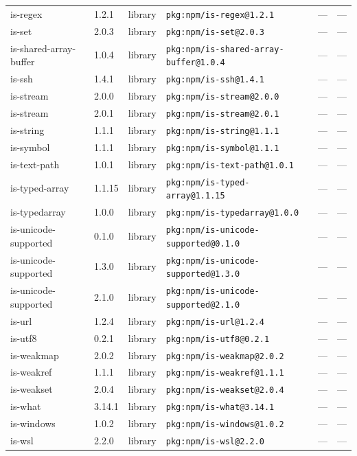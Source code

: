 \documentclass[11pt]{article}
\begin{document}
\begin{longtable}{|l|l|l|p{2.2cm}|l|p{4cm}|}
is-regex & 1.2.1 & library & \texttt{pkg:npm/is-regex@1.2.1} & — & — \\
is-set & 2.0.3 & library & \texttt{pkg:npm/is-set@2.0.3} & — & — \\
is-shared-array-buffer & 1.0.4 & library & \texttt{pkg:npm/is-shared-array-buffer@1.0.4} & — & — \\
is-ssh & 1.4.1 & library & \texttt{pkg:npm/is-ssh@1.4.1} & — & — \\
is-stream & 2.0.0 & library & \texttt{pkg:npm/is-stream@2.0.0} & — & — \\
is-stream & 2.0.1 & library & \texttt{pkg:npm/is-stream@2.0.1} & — & — \\
is-string & 1.1.1 & library & \texttt{pkg:npm/is-string@1.1.1} & — & — \\
is-symbol & 1.1.1 & library & \texttt{pkg:npm/is-symbol@1.1.1} & — & — \\
is-text-path & 1.0.1 & library & \texttt{pkg:npm/is-text-path@1.0.1} & — & — \\
is-typed-array & 1.1.15 & library & \texttt{pkg:npm/is-typed-array@1.1.15} & — & — \\
is-typedarray & 1.0.0 & library & \texttt{pkg:npm/is-typedarray@1.0.0} & — & — \\
is-unicode-supported & 0.1.0 & library & \texttt{pkg:npm/is-unicode-supported@0.1.0} & — & — \\
is-unicode-supported & 1.3.0 & library & \texttt{pkg:npm/is-unicode-supported@1.3.0} & — & — \\
is-unicode-supported & 2.1.0 & library & \texttt{pkg:npm/is-unicode-supported@2.1.0} & — & — \\
is-url & 1.2.4 & library & \texttt{pkg:npm/is-url@1.2.4} & — & — \\
is-utf8 & 0.2.1 & library & \texttt{pkg:npm/is-utf8@0.2.1} & — & — \\
is-weakmap & 2.0.2 & library & \texttt{pkg:npm/is-weakmap@2.0.2} & — & — \\
is-weakref & 1.1.1 & library & \texttt{pkg:npm/is-weakref@1.1.1} & — & — \\
is-weakset & 2.0.4 & library & \texttt{pkg:npm/is-weakset@2.0.4} & — & — \\
is-what & 3.14.1 & library & \texttt{pkg:npm/is-what@3.14.1} & — & — \\
is-windows & 1.0.2 & library & \texttt{pkg:npm/is-windows@1.0.2} & — & — \\
is-wsl & 2.2.0 & library & \texttt{pkg:npm/is-wsl@2.2.0} & — & — \\

\end{longtable}
\end{document}
